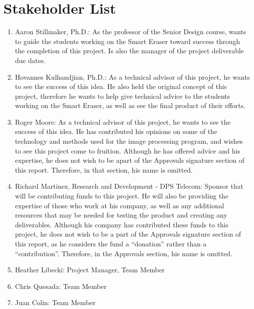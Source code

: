  \section{Stakeholder List}
 \begin{enumerate}
 	\item	Aaron Stillmaker, Ph.D.: As the professor of the Senior Design course, wants to guide the students working on the Smart Eraser toward success through the completion of this project. Is also the manager of the project deliverable due dates.\\ 
 	\item   Hovannes Kulhandjian, Ph.D.: As a technical advisor of this project, he wants to see the success of this idea. He also held the original concept of this project, therefore he wants to help give technical advice to the students working on the Smart Eraser, as well as see the final product of their efforts.\\
 	\item   Roger Moore: As a technical advisor of this project, he wants to see the success of this idea. He has contributed his opinions on some of the technology and methods used for the image processing program, and wishes to see this project come to fruition. Although he has offered advice and his expertise, he does not wish to be apart of the Approvals signature section of this report. Therefore, in that section, his name is omitted.\\
 	\item   Richard Martinez, Research and Development - DPS Telecom: Sponsor that will be contributing funds to this project. He will also be providing the expertise of those who work at his company, as well as any additional resources that may be needed for testing the product and creating any deliverables. Although his company has contributed these funds to this project, he does not wish to be a part of the Approvals signature section of this report, as he considers the fund a “donation” rather than a “contribution”. Therefore, in the Approvals section, his name is omitted.\\
 	\item	Heather Libecki: Project Manager, Team Member\\
 	\item	Chris Quesada: Team Member\\
	\item 	Juan Colin: Team Member\\
 	 	
 \end{enumerate}
 
